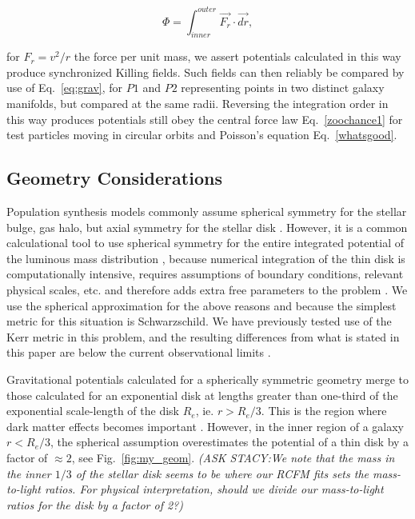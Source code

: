 \documentclass[reprint,%
 amsmath,amssymb,
 aps,
]{revtex4-1}
\begin{document}
  \begin{equation}
     \Phi  =    \int_{inner}^{outer} \vec{F_r}\cdot\vec{dr}, 
      \label{eq:Newt2}
      \end{equation}
      
for $F_r = v^2/r$ the force per unit mass, we assert 
potentials calculated in this way produce  synchronized Killing fields. Such fields can  then reliably be compared by use of  Eq.~\ref{eq:grav},  for $P1$ and $P2$ representing   points in two distinct   galaxy manifolds,   but compared   at the same radii.  
 Reversing the integration order    in this way produces potentials still obey the central force law Eq.~\ref{zoochance1} for test particles moving in circular orbits  and Poisson's equation Eq.~\ref{whatsgood}.
   
  
\subsection{  Geometry Considerations  }\label{GeomSphere}
  
   Population synthesis models commonly assume spherical symmetry for the 
  stellar bulge, gas halo, but   axial symmetry for    the stellar disk \cite{1954AJ.....59..273S}.
 However, it is a common calculational  tool to use spherical symmetry for the entire integrated potential of the luminous mass distribution  \cite{2022A&A...664A..40M,PhysRevD.70.083509}, because numerical integration of the thin disk is  computationally intensive,  requires assumptions of  boundary conditions,   relevant physical scales,  etc. and therefore adds extra free parameters to the problem \cite{2011A&A...531A..36H}.  
 We   use the spherical approximation   for the above reasons and because  the simplest metric for this situation is  
 Schwarzschild. We have previously tested use of the Kerr metric in this problem, and the resulting differences from what is stated in this paper are below the current observational limits \cite{Cisn}. 
 
Gravitational potentials calculated for  a spherically symmetric  geometry   
  merge to those calculated for an exponential disk  at lengths greater than one-third of the exponential scale-length of the disk $R_e$, ie.  $r> R_e/3$\cite{Chatterjee}. This is the region  where dark matter effects becomes important \cite{1985ApJAlbada}. 
However, 
    in the inner region of a galaxy $r< R_e/3$,  the spherical assumption   
    overestimates the potential of a thin disk by a factor of $\approx  2$, see Fig.~\ref{fig:my_geom}.  {\color{blue}\emph{(ASK STACY:We note that   the mass in the inner $1/3$ of the stellar disk seems to be where our RCFM fits   sets the mass-to-light ratios. For physical interpretation, should we divide our mass-to-light ratios for the disk by a factor of 2?)} } %
  
\end{document}
